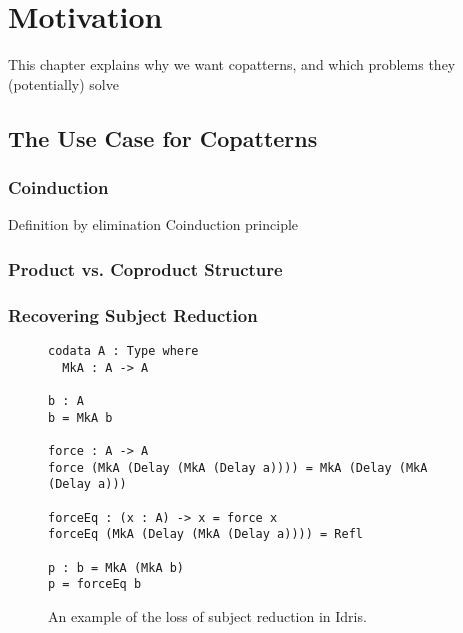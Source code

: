 \chapter{Motivation}
This chapter explains why we want copatterns, and which problems they (potentially) solve

\section{The Use Case for Copatterns}
\label{sec:motivation_copatterns}


\subsection{Coinduction}
Definition by elimination
Coinduction principle

\subsection{Product vs. Coproduct Structure}
\label{sec:prod-vs.-copr}

\subsection{Recovering Subject Reduction}


\begin{figure}
\begin{lstlisting}[mathescape]
codata A : Type where
  MkA : A -> A

b : A
b = MkA b

force : A -> A
force (MkA (Delay (MkA (Delay a)))) = MkA (Delay (MkA (Delay a)))

forceEq : (x : A) -> x = force x
forceEq (MkA (Delay (MkA (Delay a)))) = Refl

p : b = MkA (MkA b)
p = forceEq b
\end{lstlisting}
  \caption{An example of the loss of subject reduction in Idris.}
\end{figure}

